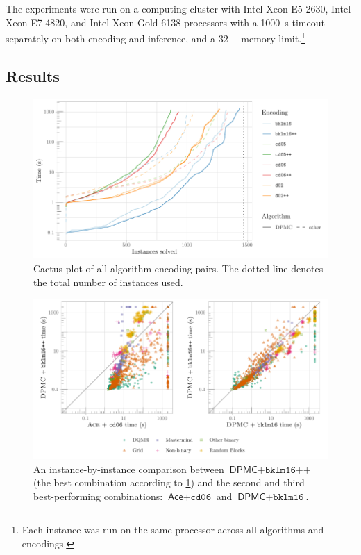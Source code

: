 The experiments were run on a computing cluster with Intel Xeon E5-2630,
Intel Xeon E7-4820, and Intel Xeon Gold 6138 processors with a
\SI{1000}{\second} timeout separately on both encoding and inference, and a
\SI{32}{\gibi\byte} memory limit.\footnote{Each instance was run on the same
  processor across all algorithms and encodings.}

\subsection{Results}

\begin{figure}
  \centering
  \includegraphics[width=\textwidth]{chapters/wmc_without_parameters/cumulative}
  \caption{Cactus plot of all algorithm-encoding pairs. The dotted line denotes
    the total number of instances used.}\label{fig:cumulative2}
\end{figure}

\begin{figure}
  \centering
  \includegraphics[width=\textwidth]{chapters/wmc_without_parameters/scatter}
  \caption{An instance-by-instance comparison between $\textsf{DPMC} +
    \texttt{bklm16++}$ (the best combination according to \cref{fig:cumulative2})
  and the second and third best-performing combinations: $\textsf{Ace} +
  \texttt{cd06}$ and $\textsf{DPMC} + \texttt{bklm16}$.}\label{fig:scatter2}
\end{figure}

